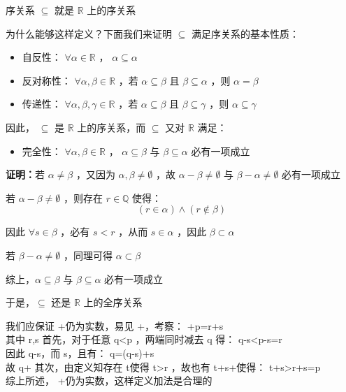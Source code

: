 \begin{definition}{序关系}
$\subseteq$ 就是 $\mathbb{R}$ 上的序关系
\end{definition}
为什么能够这样定义？下面我们来证明 $\subseteq$  满足序关系的基本性质：
\begin{itemize}
\item 自反性： $\forall \alpha\in\mathbb{R}$ ， $\alpha\subseteq\alpha$
\end{itemize}
\begin{itemize}
\item 
反对称性： $\forall \alpha,\beta\in\mathbb{R}$ ，若 $\alpha\subseteq\beta$ 且 $\beta\subseteq\alpha$ ，则 $\alpha=\beta$ 
\end{itemize}
\begin{itemize}
\item 传递性： $\forall \alpha,\beta,\gamma \in \mathbb{R}$ ，若 $\alpha\subseteq\beta$ 且 $\beta\subseteq\gamma$ ，则 $\alpha\subseteq\gamma$ 
\end{itemize}

因此， $\subseteq$ 是 $\mathbb{R}$ 上的序关系，而 $\subseteq$ 又对 $\mathbb{R}$ 满足：

\begin{itemize}
\item 完全性： $\forall \alpha,\beta \in\mathbb{R}$ ， $\alpha\subseteq \beta$  与 $\beta\subseteq \alpha$  必有一项成立
\end{itemize}

\textbf{证明：}若 $\alpha\neq\beta$ ，又因为 $\alpha,\beta\neq\emptyset$ ，故 $\alpha-\beta\neq \emptyset$ 与 $\beta-\alpha \neq \emptyset$ 必有一项成立

若 $\alpha-\beta\neq\emptyset$ ，则存在 $r\in\mathbb{Q}$ 使得：
$$(r\in\alpha)\wedge (r\notin\beta)$$

因此 $\forall s\in\beta$ ，必有 $s<r$ ，从而 $s\in\alpha$ ，因此 $\beta\subset \alpha$

若 $\beta-\alpha\neq\emptyset$ ，同理可得 $\alpha\subset \beta$

综上，$\alpha\subseteq \beta$   与 $\beta\subseteq \alpha$  必有一项成立

于是，$\subseteq$ 还是 $\mathbb{R}$ 上的全序关系



我们应保证 \alpha+\beta 仍为实数，易见 \alpha+\beta\neq \emptyset ，考察：
\alpha+\beta\ni p=r+s\\ 
其中 r\in\alpha,s\in\beta 
首先，对于任意 \ni q<p ，两端同时减去 q 得：
q-s<p-s=r \\ 
因此 q-s\in\alpha，而 s\in\beta ，且有：
q=(q-s)+s\\ 
故 q\in\alpha+\beta 
其次，由定义知存在 t\in\alpha 使得 t>r ，故也有 t+s\in\alpha+\beta 使得：
t+s>r+s=p\\ 
综上所述， \alpha+\beta 仍为实数，这样定义加法是合理的

